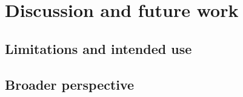 \chapter{Discussion and future work}\label{ch:conclusion} 
\section{Limitations and intended use}\label{sec:ch7-limitations}
\section{Broader perspective}\label{sec:broader-perspective}
